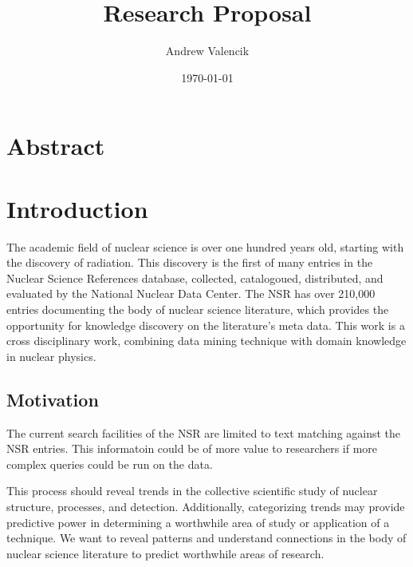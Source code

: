 \documentclass[12pt]{article}
\begin{document}
\title{Research Proposal}
\author{Andrew Valencik}
\date{\today}
\maketitle
\tableofcontents
\begin{doublespacing}


\pagebreak
\section{Abstract}

\pagebreak
\section{Introduction}

The academic field of nuclear science is over one hundred years old, starting with the discovery of radiation.
This discovery is the first of many entries in the Nuclear Science References database, collected, catalogoued, distributed, and evaluated by the National Nuclear Data Center. \citep{Kurgan200603} 
The NSR has over 210,000 entries documenting the body of nuclear science literature, which provides the opportunity for knowledge discovery on the literature's meta data.
This work is a cross disciplinary work, combining data mining technique with domain knowledge in nuclear physics. 


\subsection{Motivation}
The current search facilities of the NSR are limited to text matching against the NSR entries.
This informatoin could be of more value to researchers if more complex queries could be run on the data.

This process should reveal trends in the collective scientific study of nuclear structure, processes, and detection.
Additionally, categorizing trends may provide predictive power in determining a worthwhile area of study or application of a technique.
We want to reveal patterns and understand connections in the body of nuclear science literature to predict worthwhile areas of research.


\end{doublespacing}
\end{document}
